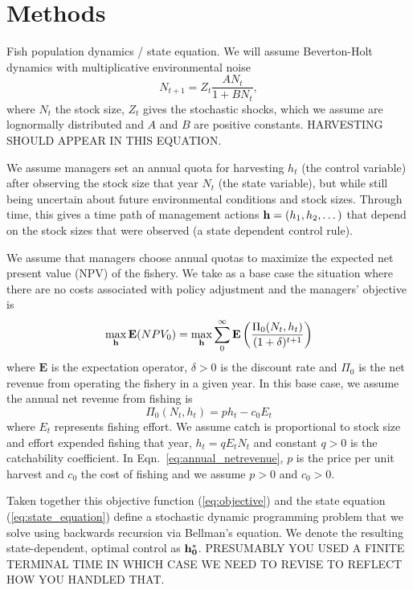 \documentclass[12pt]{article}
\begin{document}
\section{Methods}

 Fish population dynamics / state equation.  We will assume Beverton-Holt dynamics with multiplicative environmental noise
    \begin{equation} 
      N_{t+1} = Z_t \frac{A N_t}{1 + B N_t}, 
\label{eq:state_equation}
    \end{equation}
where $N_t$ the stock size, $Z_t$ gives the stochastic shocks, which we assume are lognormally distributed and $A$ and $B$ are positive constants. HARVESTING SHOULD APPEAR IN THIS EQUATION.

We assume managers set an annual quota for harvesting $h_t$ (the control variable) after observing the stock size that year $N_t$ (the state variable), but while still being uncertain about future environmental conditions and stock sizes. Through time, this gives a time path of management actions ${\bf h}=(h_1,h_2,\dots)$ that depend on the stock sizes that were observed (a state dependent control rule). 

We assume that managers choose annual quotas to maximize the expected net present value (NPV) of the fishery. We take as a base case the situation where there are no costs associated with policy adjustment and the managers' objective is
\begin{equation}
\max_{{\bf h}}\mathbf{ E} ( NPV_{0} )=\max_{{\bf h}} \sum_0^\infty \mathbf{E} \left( \displaystyle \frac{\Pi_0(N_t,h_t)}{(1+\delta)^{t+1}} \right)
\label{eq:objective}
\end{equation}
where $\mathbf{E}$ is the expectation operator, $\delta>0$ is the discount rate and $\Pi_0$ is the net revenue from operating the fishery in a given year. In this base case, we assume the annual net revenue from fishing is 
  \begin{equation} 
    \Pi_0(N_t,h_t) = p h_t -  c_0 E_t
\label{eq:annual_netrevenue}
  \end{equation}
  where $E_t$ represents
  fishing effort. We assume catch is proportional to stock size and effort expended fishing that year, $h_t=qE_tN_t$ and constant $q>0$ is the catchability coefficient. In Eqn.~\ref{eq:annual_netrevenue}, $p$ is the price per unit harvest and $c_0$ the cost of fishing and we assume $p>0$ and $c_0>0$.

Taken together this objective function (\ref{eq:objective}) and the state equation (\ref{eq:state_equation}) define a stochastic dynamic programming problem that we solve using backwards recursion via Bellman's equation. We denote the resulting state-dependent, optimal control as ${\bf h_0^*}$. PRESUMABLY YOU USED A FINITE TERMINAL TIME IN WHICH CASE WE NEED TO REVISE TO REFLECT HOW YOU HANDLED THAT.
\end{document}
